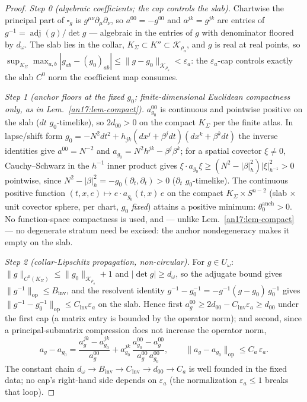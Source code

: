 \begin{proof}
\emph{Step 0 (algebraic coefficients; the cap controls the slab).}
Chartwise the principal part of $\square_g$ is
$g^{\mu\nu}\partial_\mu\partial_\nu$, so $a^{00}=-g^{00}$ and
$a^{jk}=g^{jk}$ are entries of $g^{-1}=\operatorname{adj}(g)/\det g$ ---
algebraic in the entries of $g$ with denominator floored by $d_\omega$.
The slab lies in the collar, $K_\Sigma\subset K''\subset\mathcal
K_{\rho_a}$, and $g$ is real at real points, so
$\sup_{K_\Sigma}\max_{a,b}|g_{ab}-(g_0)_{ab}|\le
\|g-g_0\|_{\mathcal K_{\rho_a}}<\varepsilon_a$: the $\varepsilon_a$-cap
controls exactly the slab $C^0$ norm the coefficient map consumes.

\emph{Step 1 (anchor floors at the fixed $g_0$; finite-dimensional
Euclidean compactness only, as in Lem.~\ref{an17:lem-compact}).}
$a^{00}_{g_0}$ is continuous and pointwise positive on the slab ($dt$
$g_0$-timelike), so $2d_{00}>0$ on the compact $K_\Sigma$ per the finite
atlas. In lapse/shift form $g_0=-N^2dt^2+h_{jk}(dx^j+\beta^jdt)
(dx^k+\beta^kdt)$ the inverse identities give $a^{00}=N^{-2}$ and
$a_{g_0}=N^2h^{jk}-\beta^j\beta^k$; for a spatial covector $\xi\ne0$,
Cauchy--Schwarz in the $h^{-1}$ inner product gives
$\xi\!\cdot\!a_{g_0}\xi\ge(N^2-|\beta|_h^2)|\xi|^2_{h^{-1}}>0$ pointwise,
since $N^2-|\beta|_h^2=-g_0(\partial_t,\partial_t)>0$ ($\partial_t$
$g_0$-timelike). The continuous positive function $(t,x,e)\mapsto
e\!\cdot\!a_{g_0}(t,x)\,e$ on the compact $K_\Sigma\times S^{n-2}$ (slab
$\times$ unit covector sphere, per chart, $g_0$ \emph{fixed}) attains a
positive minimum: $\theta_0^{\mathrm{anch}}>0$. No function-space
compactness is used, and --- unlike Lem.~\ref{an17:lem-compact} --- no
degenerate stratum need be excised: the anchor nondegeneracy makes it
empty on the slab.

\emph{Step 2 (collar-Lipschitz propagation, non-circular).} For $g\in
U_\omega$: $\|g\|_{C^0(K_\Sigma)}\le\|g_0\|_{\mathcal K_{\rho_a}}+1$ and
$|\det g|\ge d_\omega$, so the adjugate bound gives
$\|g^{-1}\|_{\mathrm{op}}\le B_{\mathrm{inv}}$, and the resolvent identity
$g^{-1}-g_0^{-1}=-g^{-1}(g-g_0)\,g_0^{-1}$ gives
$\|g^{-1}-g_0^{-1}\|_{\mathrm{op}}\le C_{\mathrm{inv}}\varepsilon_a$ on
the slab. Hence first $a^{00}_g\ge2d_{00}-C_{\mathrm{inv}}\varepsilon_a
\ge d_{00}$ under the first cap (a matrix entry is bounded by the operator
norm); and second, since a principal-submatrix compression does not
increase the operator norm,
\[
 a_g-a_{g_0}=\frac{a^{jk}_g-a^{jk}_{g_0}}{a^{00}_g}
 +a^{jk}_{g_0}\,\frac{a^{00}_{g_0}-a^{00}_g}{a^{00}_g\,a^{00}_{g_0}},
 \qquad
 \|a_g-a_{g_0}\|_{\mathrm{op}}\le C_a\,\varepsilon_a .
\]
The constant chain $d_\omega\to B_{\mathrm{inv}}\to C_{\mathrm{inv}}\to
d_{00}\to C_a$ is well founded in the fixed data; no cap's right-hand
side depends on $\varepsilon_a$ (the normalization $\varepsilon_a\le1$
breaks that loop).


\end{proof}

